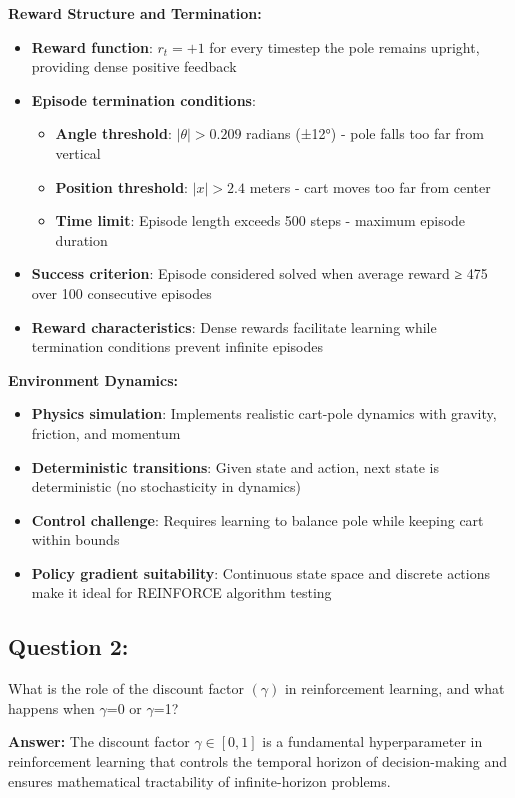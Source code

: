\documentclass[12pt]{article}
\begin{document}
{{{\textbf{Reward Structure and Termination:}
\begin{itemize}
    \item \textbf{Reward function}: $r_t = +1$ for every timestep the pole remains upright, providing dense positive feedback
    \item \textbf{Episode termination conditions}:
    \begin{itemize}
        \item \textbf{Angle threshold}: $|\theta| > 0.209$ radians (±12°) - pole falls too far from vertical
        \item \textbf{Position threshold}: $|x| > 2.4$ meters - cart moves too far from center
        \item \textbf{Time limit}: Episode length exceeds 500 steps - maximum episode duration
    \end{itemize}
    \item \textbf{Success criterion}: Episode considered solved when average reward ≥ 475 over 100 consecutive episodes
    \item \textbf{Reward characteristics}: Dense rewards facilitate learning while termination conditions prevent infinite episodes
\end{itemize}

\textbf{Environment Dynamics:}
\begin{itemize}
    \item \textbf{Physics simulation}: Implements realistic cart-pole dynamics with gravity, friction, and momentum
    \item \textbf{Deterministic transitions}: Given state and action, next state is deterministic (no stochasticity in dynamics)
    \item \textbf{Control challenge}: Requires learning to balance pole while keeping cart within bounds
    \item \textbf{Policy gradient suitability}: Continuous state space and discrete actions make it ideal for REINFORCE algorithm testing
\end{itemize}

\subsection{Question 2:}

What is the role of the discount factor $(\gamma)$ in reinforcement learning, and what happens when $\gamma$=0 or $\gamma$=1?
\vspace*{0.3cm}

\textbf{Answer:} The discount factor $\gamma \in [0, 1]$ is a fundamental hyperparameter in reinforcement learning that controls the temporal horizon of decision-making and ensures mathematical tractability of infinite-horizon problems.

}}}
\end{document}
